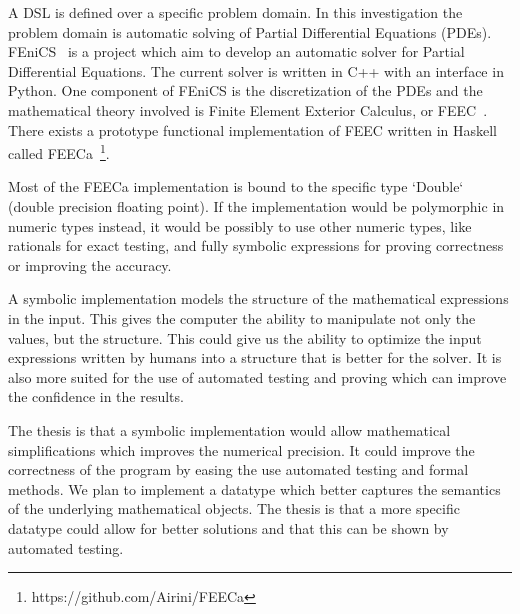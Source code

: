 \documentclass{scrartcl}
\begin{document}
A DSL is defined over a specific problem domain. In this investigation the
problem domain is automatic solving of Partial Differential Equations (PDEs).
FEniCS~\cite{AlnaesBlechta2015a} is a project which aim to develop an automatic
solver for Partial Differential Equations.  The current solver is written in
C++ with an interface in Python. One component of FEniCS is the discretization
of the PDEs and the mathematical theory involved is Finite Element Exterior
Calculus, or FEEC~\cite{arnold2006finite}.  There exists a prototype functional
implementation of FEEC written in Haskell called
FEECa~\footnote{https://github.com/Airini/FEECa}.


Most of the FEECa implementation is bound to the specific type `Double` (double
precision floating point).  If the implementation would be polymorphic in
numeric types instead, it would be possibly to use other numeric types, like
rationals for exact testing, and fully symbolic expressions for proving
correctness or improving the accuracy.

A symbolic implementation models the structure of the mathematical expressions
in the input.  This gives the computer the ability to manipulate not only the
values, but the structure.  This could give us the ability to optimize the
input expressions written by humans into a structure that is better for the
solver. It is also more suited for the use of automated testing and proving
which can improve the confidence in the results.


The thesis is that a symbolic implementation would allow mathematical
simplifications which improves the numerical precision. It could improve the
correctness of the program by easing the use automated testing and formal
methods.  We plan to implement a datatype which better captures the semantics
of the underlying mathematical objects.  The thesis is that a more specific
datatype could allow for better solutions and that this can be shown by
automated testing.


\end{document}
